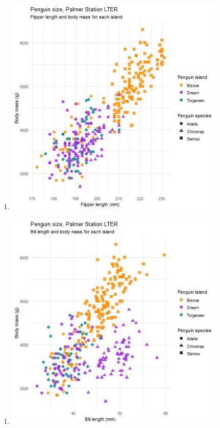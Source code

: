 \documentclass[
  authoryear,
  preprint,
  3p]{elsarticle}
\providecommand{\tightlist}{%
  \setlength{\itemsep}{0pt}\setlength{\parskip}{0pt}}\usepackage{longtable,booktabs,array}
\begin{document}
\begin{figure}
\begin{minipage}[b]{0.33\linewidth}
{\begin{enumerate}
\def\labelenumi{\alph{enumi})}
\tightlist
\item
  \includegraphics{Figures/myplot1.jpg}
\end{enumerate}

}

\end{minipage}%
%
\begin{minipage}[b]{0.33\linewidth}

{\centering 

\begin{enumerate}
\def\labelenumi{\alph{enumi})}
\setcounter{enumi}{1}
\tightlist
\item
  \includegraphics{Figures/myplot2.jpg}
\end{enumerate}

}
\end{minipage}
\end{figure}
\end{document}
